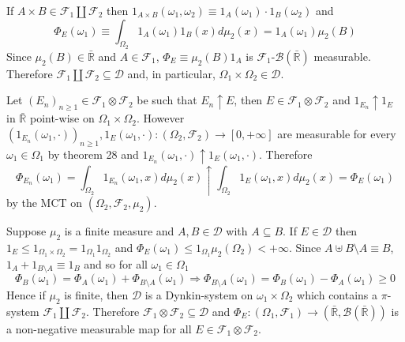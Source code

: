 \documentclass[a4paper]{article}
\newcommand{\clo}[1]{\left [ #1 \right ]}
\newcommand{\brac}[1]{\left ( #1 \right )}
\newcommand{\Rbar}{{\bar{\mathbb{R}}}}
\newcommand{\Zinf}{\clo{ 0, +\infty }}
\newcommand{\Dcal}{\mathcal{D}}
\newcommand{\Fcal}{\mathcal{F}}
\newcommand{\borel}[1]{\mathcal{B}\brac{#1}}
\begin{document}
If $A\times B\in \Fcal_1 \coprod \Fcal_2$ then $1_{A\times B}\brac{\omega_1, \omega_2} \equiv 1_A\brac{\omega_1} \cdot 1_B\brac{\omega_2}$ and \[\Phi_E\brac{\omega_1} \equiv \int_{\Omega_2} 1_A\brac{\omega_1} 1_B\brac{x} d\mu_2\brac{x} = 1_A\brac{\omega_1} \mu_2\brac{B}\] Since $\mu_2\brac{B}\in \Rbar$ and $A\in \Fcal_1$, $\Phi_E \equiv \mu_2\brac{B} 1_A$ is $\Fcal_1$-$\borel{\Rbar}$ measurable. Therefore $\Fcal_1\coprod \Fcal_2\subseteq \Dcal$ and, in particular, $\Omega_1\times \Omega_2 \in \Dcal$.

Let $\brac{E_n}_{n\geq 1}\in \Fcal_1\otimes \Fcal_2$ be such that $E_n\uparrow E$, then $E\in \Fcal_1\otimes \Fcal_2$ and $1_{E_n}\uparrow 1_E$ in $\Rbar$ point-wise on $\Omega_1\times \Omega_2$. However $\brac{1_{E_n}\brac{\omega_1, \cdot}}_{n\geq 1}, 1_E\brac{\omega_1, \cdot}:\brac{\Omega_2, \Fcal_2}\to\Zinf$ are measurable for every $\omega_1\in \Omega_1$ by theorem 28 and $1_{E_n}\brac{\omega_1, \cdot}\uparrow 1_E\brac{\omega_1, \cdot}$. Therefore \[\Phi_{E_n}\brac{\omega_1} = \int_{\Omega_2} 1_{E_n}\brac{\omega_1, x} d\mu_2\brac{x}\uparrow \int_{\Omega_2} 1_E\brac{\omega_1, x} d\mu_2\brac{x} = \Phi_E\brac{\omega_1}\] by the MCT on $\brac{\Omega_2, \Fcal_2, \mu_2}$.

Suppose $\mu_2$ is a finite measure and $A,B\in \Dcal$ with $A\subseteq B$. If $E\in \Dcal$ then $1_E\leq 1_{\Omega_1\times\Omega_2} = 1_{\Omega_1} 1_{\Omega_2}$ and $\Phi_E\brac{\omega_1} \leq 1_{\Omega_1} \mu_2\brac{\Omega_2} < +\infty$. Since $A\uplus B\setminus A \equiv B$, $1_A+ 1_{B\setminus A} \equiv 1_B$  and so for all $\omega_1\in \Omega_1$ \[\Phi_B\brac{\omega_1} = \Phi_A\brac{\omega_1} + \Phi_{B\setminus A}\brac{\omega_1} \Rightarrow \Phi_{B\setminus A}\brac{\omega_1} = \Phi_B\brac{\omega_1} - \Phi_A\brac{\omega_1} \geq 0\] Hence if $\mu_2$ is finite, then $\Dcal$ is a Dynkin-system on $\omega_1\times\Omega_2$ which contains a $\pi$-system $\Fcal_1\coprod \Fcal_2$. Therefore $\Fcal_1\otimes \Fcal_2\subseteq \Dcal$ and $\Phi_E:\brac{\Omega_1, \Fcal_1}\to\brac{\Rbar, \borel{\Rbar}}$ is a non-negative measurable map for all $E\in \Fcal_1\otimes \Fcal_2$.
\end{document}
